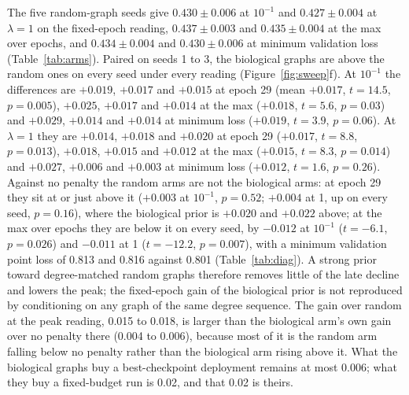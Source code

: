 The five random-graph seeds give $0.430 \pm 0.006$ at $10^{-1}$ and $0.427 \pm 0.004$
at $\lambda = 1$ on the fixed-epoch reading, $0.437 \pm 0.003$ and $0.435 \pm 0.004$ at
the max over epochs, and $0.434 \pm 0.004$ and $0.430 \pm 0.006$ at minimum validation
loss (Table~\ref{tab:arms}). Paired on seeds 1 to 3, the biological graphs are above the
random ones on every seed under every reading (Figure~\ref{fig:sweep}f). At $10^{-1}$
the differences are $+0.019$, $+0.017$ and $+0.015$ at epoch 29 (mean $+0.017$,
$t = 14.5$, $p = 0.005$), $+0.025$, $+0.017$ and $+0.014$ at the max ($+0.018$,
$t = 5.6$, $p = 0.03$) and $+0.029$, $+0.014$ and $+0.014$ at minimum loss ($+0.019$,
$t = 3.9$, $p = 0.06$). At $\lambda = 1$ they are $+0.014$, $+0.018$ and $+0.020$ at
epoch 29 ($+0.017$, $t = 8.8$, $p = 0.013$), $+0.018$, $+0.015$ and $+0.012$ at the max
($+0.015$, $t = 8.3$, $p = 0.014$) and $+0.027$, $+0.006$ and $+0.003$ at minimum loss
($+0.012$, $t = 1.6$, $p = 0.26$). Against no penalty the random arms are not the
biological arms: at epoch 29 they sit at or just above it ($+0.003$ at $10^{-1}$,
$p = 0.52$; $+0.004$ at 1, up on every seed, $p = 0.16$), where the biological prior is
$+0.020$ and $+0.022$ above; at the max over epochs they are below it on every seed, by
$-0.012$ at $10^{-1}$ ($t = -6.1$, $p = 0.026$) and $-0.011$ at 1 ($t = -12.2$,
$p = 0.007$), with a minimum validation point loss of 0.813 and 0.816 against 0.801
(Table~\ref{tab:diag}). A strong prior toward degree-matched random graphs therefore
removes little of the late decline and lowers the peak; the fixed-epoch gain of the
biological prior is not reproduced by conditioning on any graph of the same degree
sequence. The gain over random at the peak reading, 0.015 to 0.018, is larger than the
biological arm's own gain over no penalty there (0.004 to 0.006), because most of it is
the random arm falling below no penalty rather than the biological arm rising above it.
What the biological graphs buy a best-checkpoint deployment remains at most 0.006; what
they buy a fixed-budget run is 0.02, and that 0.02 is theirs.
